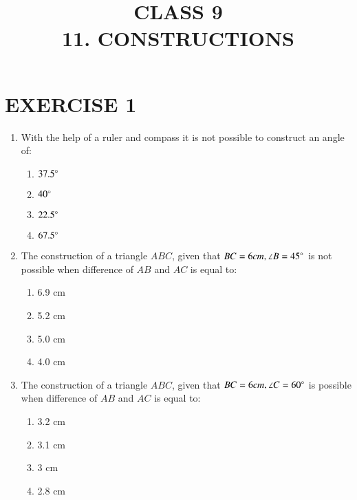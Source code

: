 \documentclass{article}
\begin{document}
\title{CLASS 9\\11. CONSTRUCTIONS}
\date{}
\maketitle
\section{EXERCISE 1}
\begin{enumerate}
	\item With the help of a ruler and compass it is not possible to construct an angle of:
		\begin{enumerate}
			\item $37.5\degree$
			\item $40\degree$
			\item $22.5\degree$
			\item $67.5\degree$
		\end{enumerate}
	\item The construction of a triangle $ABC$, given that $BC = 6 cm, \angle B = 45\degree$ is not possible when difference of $AB$ and $AC$ is equal to:
		\begin{enumerate}
			\item 6.9 cm
			\item 5.2 cm
			\item 5.0 cm
			\item 4.0 cm
		\end{enumerate}
	\item The construction of a triangle $ABC$, given that $BC = 6 cm, \angle C = 60\degree$ is possible when difference of $AB$ and $AC$ is equal to:
		\begin{enumerate}
			\item 3.2 cm
			\item 3.1 cm
			\item 3 cm
			\item 2.8 cm
		\end{enumerate}
\end{enumerate}
\end{document}

